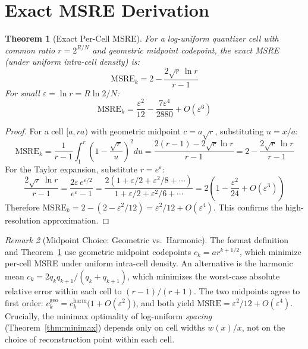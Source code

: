 \documentclass[11pt,letterpaper]{article}
\newtheorem{theorem}{Theorem}[section]
\theoremstyle{definition}
\theoremstyle{remark}
\newtheorem{remark}[theorem]{Remark}
\newcommand{\MSRE}{\mathrm{MSRE}}
\begin{document}
\section{Exact MSRE Derivation}
\label{sec:appendix-msre}

\begin{theorem}[Exact Per-Cell MSRE]
\label{thm:exact-msre}
For a log-uniform quantizer cell with common ratio $r = 2^{R/N}$ and geometric
midpoint codepoint, the exact MSRE (under uniform intra-cell density) is:
\begin{equation}
  \MSRE_k = 2 - \frac{2\sqrt{r}\,\ln r}{r - 1}
  \label{eq:exact-msre}
\end{equation}
For small $\varepsilon = \ln r = R\ln 2/N$:
\begin{equation}
  \boxed{\MSRE_k = \frac{\varepsilon^2}{12} - \frac{7\varepsilon^4}{2880}
  + O(\varepsilon^6)}
  \label{eq:msre-taylor}
\end{equation}
\end{theorem}

\begin{proof}
For a cell $[a, ra)$ with geometric midpoint $c = a\sqrt{r}$, substituting
$u = x/a$:
\[
  \MSRE_k = \frac{1}{r-1}\int_1^r
  \!\left(1 - \frac{\sqrt{r}}{u}\right)^{\!2} du
  = \frac{2(r-1) - 2\sqrt{r}\ln r}{r - 1}
  = 2 - \frac{2\sqrt{r}\,\ln r}{r - 1}
\]
For the Taylor expansion, substitute $r = e^\varepsilon$:
\[
  \frac{2\sqrt{r}\,\ln r}{r-1}
  = \frac{2\varepsilon\, e^{\varepsilon/2}}{e^\varepsilon - 1}
  = \frac{2(1 + \varepsilon/2 + \varepsilon^2/8 + \cdots)}
         {1 + \varepsilon/2 + \varepsilon^2/6 + \cdots}
  = 2\!\left(1 - \frac{\varepsilon^2}{24} + O(\varepsilon^3)\right)
\]
Therefore
$\MSRE_k = 2 - (2 - \varepsilon^2/12) = \varepsilon^2/12 + O(\varepsilon^4)$.
This confirms the high-resolution approximation.
\end{proof}

\begin{remark}[Midpoint Choice: Geometric vs.\ Harmonic]
\label{rem:midpoint-choice}
The format definition and Theorem~\ref{thm:exact-msre} use geometric midpoint
codepoints $c_k = a r^{k+1/2}$, which minimize per-cell MSRE under uniform
intra-cell density.
An alternative is the harmonic mean
$c_k = 2q_k q_{k+1}/(q_k + q_{k+1})$, which minimizes the worst-case absolute
relative error within each cell to $(r-1)/(r+1)$.
The two midpoints agree to first order:
$c_k^{\mathrm{geo}} = c_k^{\mathrm{harm}}\bigl(1 + O(\varepsilon^2)\bigr)$,
and both yield $\MSRE = \varepsilon^2/12 + O(\varepsilon^4)$.
Crucially, the minimax optimality of log-uniform \emph{spacing}
(Theorem~\ref{thm:minimax}) depends only on cell widths $w(x)/x$, not on the
choice of reconstruction point within each cell.
\end{remark}
\end{document}
